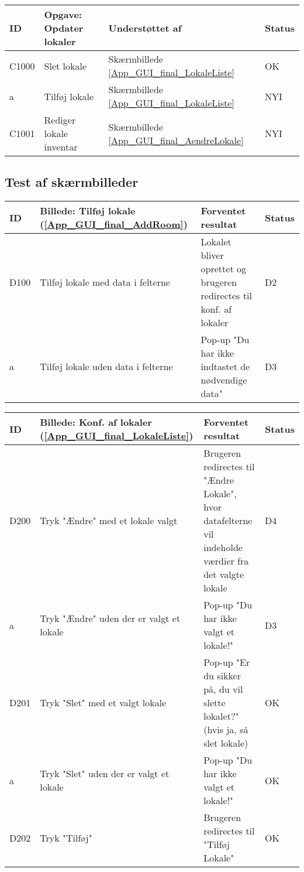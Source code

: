 \begin{tabular}{ |p{0.85cm}| p{7.1cm} | p{5.5cm} | p{2cm} | }
\hline
\textbf{ID} & \textbf{Opgave: Opdater lokaler} & \textbf{Understøttet af} & \textbf{Status}\\ 
\hline
C1000 & Slet lokale & Skærmbillede \ref{App_GUI_final_LokaleListe} & OK \\
\hline
a & Tilføj lokale & Skærmbillede \ref{App_GUI_final_LokaleListe} & NYI \\
\hline
C1001 & Rediger lokale inventar & Skærmbillede \ref{App_GUI_final_AendreLokale} & NYI \\
\hline
\end{tabular}
\pagebreak

\subsection{Test af skærmbilleder}
\label{App_Test_ListOfTest_ScreenTests}
\begin{tabular}{ |p{0.85cm}| p{5.5cm} | p{8.65cm} | p{1cm} | }
\hline
\textbf{ID} & \textbf{Billede: Tilføj lokale (\ref{App_GUI_final_AddRoom})}  & \textbf{Forventet resultat} & \textbf{Status}\\ 
\hline
D100 &Tilføj lokale med data i felterne & Lokalet bliver oprettet og brugeren redirectes til konf. af lokaler & D2 \\
\hline
a & Tilføj lokale uden data i felterne & Pop-up "Du har ikke indtastet de nødvendige data" & D3\\
\hline
\end{tabular}

\begin{tabular}{ |p{0.85cm}| p{5.5cm} | p{8.65cm} | p{1cm} | }
\hline
\textbf{ID} & \textbf{Billede: Konf. af lokaler (\ref{App_GUI_final_LokaleListe})} & \textbf{Forventet resultat} & \textbf{Status}\\ 
\hline
D200 & Tryk "Ændre" med et lokale valgt & Brugeren redirectes til "Ændre Lokale", hvor datafelterne vil indeholde værdier fra det valgte lokale & D4\\
\hline
a & Tryk "Ændre" uden der er valgt et lokale & Pop-up "Du har ikke valgt et lokale!" & D3 \\
\hline
D201 & Tryk "Slet" med et valgt lokale & Pop-up "Er du sikker på, du vil slette lokalet?" (hvis ja, så slet lokale) & OK \\
\hline
a & Tryk "Slet" uden der er valgt et lokale & Pop-up "Du har ikke valgt et lokale!" & OK \\
\hline
D202 & Tryk "Tilføj" & Brugeren redirectes til "Tilføj Lokale" & OK\\
\hline
\end{tabular}

